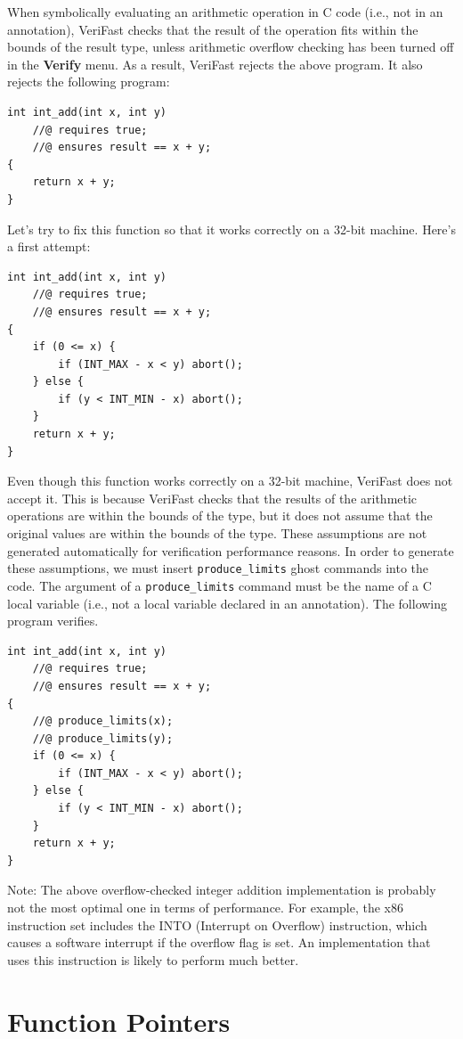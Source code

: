 \documentclass{article}
\begin{document}
When symbolically evaluating an arithmetic operation in C code
(i.e., not in an annotation), VeriFast checks that the result
of the operation fits within the bounds of the result type,
unless arithmetic overflow checking has been turned off in the
\textbf{Verify} menu. As a result, VeriFast rejects the above
program. It also rejects the following program:
\begin{lstlisting}
int int_add(int x, int y)
    //@ requires true;
    //@ ensures result == x + y;
{
    return x + y;
}
\end{lstlisting}
Let's try to fix this function so that it works correctly on a
32-bit machine. Here's a first attempt:
\begin{lstlisting}
int int_add(int x, int y)
    //@ requires true;
    //@ ensures result == x + y;
{
    if (0 <= x) {
        if (INT_MAX - x < y) abort();
    } else {
        if (y < INT_MIN - x) abort();
    }
    return x + y;
}
\end{lstlisting}
Even though this function works correctly on a 32-bit machine,
VeriFast does not accept it. This is because VeriFast checks
that the results of the arithmetic operations are within the
bounds of the type, but it does not assume that the original
values are within the bounds of the type. These assumptions are
not generated automatically for verification performance
reasons. In order to generate these assumptions, we must insert
\lstinline!produce_limits! ghost commands into the code. The
argument of a \lstinline!produce_limits! command must be the
name of a C local variable (i.e., not a local variable declared
in an annotation). The following program verifies.
\begin{lstlisting}
int int_add(int x, int y)
    //@ requires true;
    //@ ensures result == x + y;
{
    //@ produce_limits(x);
    //@ produce_limits(y);
    if (0 <= x) {
        if (INT_MAX - x < y) abort();
    } else {
        if (y < INT_MIN - x) abort();
    }
    return x + y;
}
\end{lstlisting}

Note: The above overflow-checked integer addition
implementation is probably not the most optimal one in terms of
performance. For example, the x86 instruction set includes the
INTO (Interrupt on Overflow) instruction, which causes a
software interrupt if the overflow flag is set. An
implementation that uses this instruction is likely to perform
much better.

\section{Function Pointers}\label{section:function-pointers}
\end{document}

